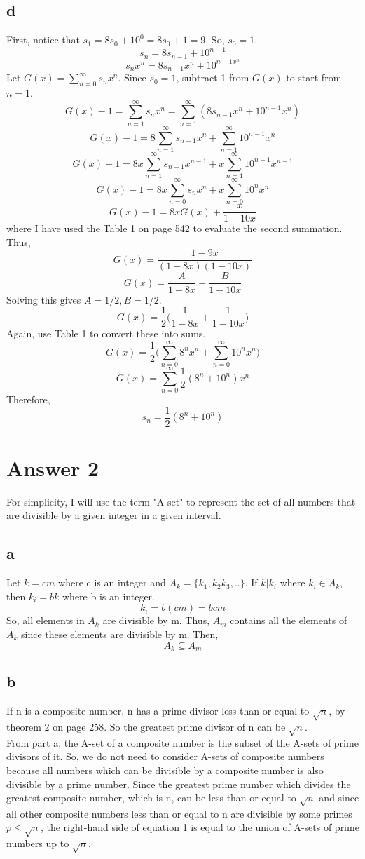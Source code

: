 \documentclass[12pt]{article}
\begin{document}
\subsection*{d}
First, notice that $s_1=8s_0+10^0=8s_0+1=9$. So, $s_0=1$.
$$s_n=8s_{n-1}+10^{n-1}$$
$$s_nx^n=8s_{n-1}x^n+10^{n-1x^n}$$
Let $G(x)=\sum_{n=0}^{\infty}s_nx^n$. Since $s_0=1$, subtract 1 from $G(x)$ to start from $n=1$.
$$G(x)-1=\sum_{n=1}^{\infty}s_nx^n=\sum_{n=1}^{\infty}(8s_{n-1}x^n+10^{n-1}x^n)$$
$$G(x)-1=8\sum_{n=1}^{\infty}s_{n-1}x^n+\sum_{n=1}^{\infty}10^{n-1}x^n$$
$$G(x)-1=8x\sum_{n=1}^{\infty}s_{n-1}x^{n-1}+x\sum_{n=1}^{\infty}10^{n-1}x^{n-1}$$
$$G(x)-1=8x\sum_{n=0}^{\infty}s_{n}x^{n}+x\sum_{n=0}^{\infty}10^{n}x^{n}$$
$$G(x)-1=8xG(x)+\dfrac{x}{1-10x}$$
where I have used the Table 1 on page 542 to evaluate the second summation. Thus,
$$G(x)=\dfrac{1-9x}{(1-8x)(1-10x)}$$
$$G(x)=\dfrac{A}{1-8x}+\dfrac{B}{1-10x}$$
Solving this gives $A=1/2, B=1/2$.
$$G(x)=\frac{1}{2}\bigg(\dfrac{1}{1-8x}+\dfrac{1}{1-10x}\bigg)$$
Again, use Table 1 to convert these into sums.
$$G(x)=\frac{1}{2}\bigg(\sum_{n=0}^{\infty}8^nx^n+\sum_{n=0}^{\infty}10^nx^n\bigg)$$
$$G(x)=\sum_{n=0}^{\infty}\frac{1}{2}(8^n+10^n)x^n$$
Therefore,
$$s_n=\frac{1}{2}(8^n+10^n)$$

\section*{Answer 2}
For simplicity, I will use the term "A-set" to represent the set of all numbers that are divisible by a given integer in a given interval.
\subsection*{a}
Let $k=cm$ where c is an integer and $A_k=\{k_1,k_2k_3,..\}$. If $k|k_i$ where $k_i\in A_k$, then $k_i=bk$ where b is an integer.
$$k_i=b(cm)=bcm$$
So, all elements in $A_k$ are divisible by m. Thus, $A_m$ contains all the elements of $A_k$ since these elements are divisible by m. Then,
$$A_k\subseteq A_m$$
\subsection*{b}
If n is a composite number, n has a prime divisor less than or equal to $\sqrt{n}$, by theorem 2 on page 258. So the greatest prime divisor of n can be $\sqrt{n}$.\\
From part a, the A-set of a composite number is the subset of the A-sets of prime divisors of it. So, we do not need to consider A-sets of composite numbers because all numbers which can be divisible by a composite number is also divisible by a prime number. Since the greatest prime number which divides the greatest composite number, which is n, can be less than or equal to $\sqrt{n}$ and since all other composite numbers less than  or equal to n are divisible by some primes $p\leq \sqrt{n}$, the right-hand side of equation 1 is equal to the union of A-sets of prime numbers up to $\sqrt{n}$.
\end{document}
